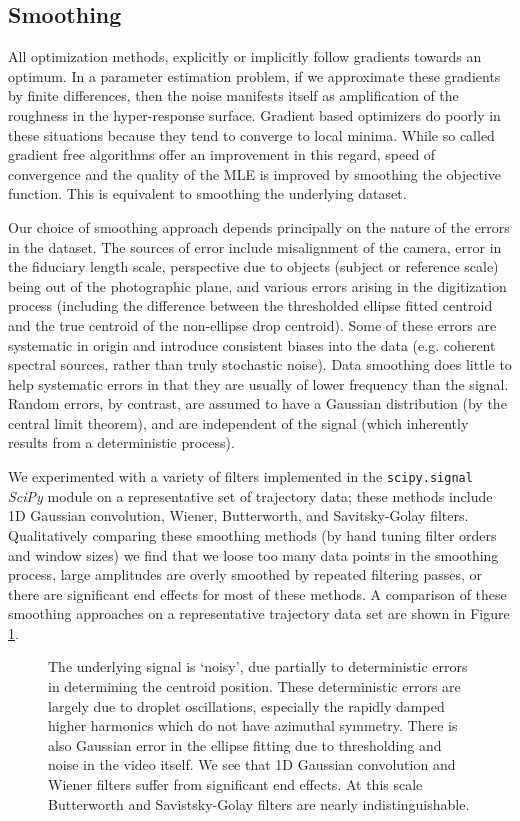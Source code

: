 \documentclass[10pt,a4paper]{article}
\begin{document}
\subsection{Smoothing}
All optimization methods, explicitly or implicitly follow gradients towards an optimum. In a parameter estimation problem, if we approximate these gradients by finite differences, then the noise manifests itself as amplification of the roughness in the hyper-response surface. Gradient based optimizers do poorly in these situations because they tend to converge to local minima. While so called gradient free algorithms offer an improvement in this regard, speed of convergence and the quality of the MLE is improved by smoothing the objective function. This is equivalent to smoothing the underlying dataset.

Our choice of smoothing approach depends principally on the nature of the errors in the dataset. The sources of error include misalignment of the camera, error in the fiduciary length scale, perspective due to objects (subject or reference scale) being out of the photographic plane, and various errors arising in the digitization process (including the difference between the thresholded ellipse fitted centroid and the true centroid of the non-ellipse drop centroid). Some of these errors are systematic in origin and introduce consistent biases into the data (e.g. coherent spectral sources, rather than truly stochastic noise). Data smoothing does little to help systematic errors in that they are usually of lower frequency than the signal. Random errors, by contrast, are assumed to have a Gaussian distribution (by the central limit theorem), and are independent of the signal (which inherently results from a deterministic process).

We experimented with a variety of filters implemented in the \verb|scipy.signal| \emph{SciPy} module on a representative set of trajectory data; these methods include 1D Gaussian convolution, Wiener, Butterworth, and Savitsky-Golay filters. Qualitatively comparing these smoothing methods (by hand tuning filter orders and window sizes) we find that we loose too many data points in the smoothing process, large amplitudes are overly smoothed by repeated filtering passes, or there are significant end effects for most of these methods. A comparison of these smoothing approaches on a representative trajectory data set are shown in Figure \ref{fig:y_filtered}.

\begin{figure}
    \centering
    
       \caption{The underlying signal is `noisy', due partially to deterministic errors in determining the centroid position. These deterministic errors are largely due to droplet oscillations, especially the rapidly damped higher harmonics which do not have azimuthal symmetry. There is also Gaussian error in the ellipse fitting due to thresholding and noise in the video itself. We see that 1D Gaussian convolution and Wiener filters suffer from significant end effects. At this scale Butterworth and Savistsky-Golay filters are nearly indistinguishable.}
      \label{fig:y_filtered}
\end{figure}
\end{document}
